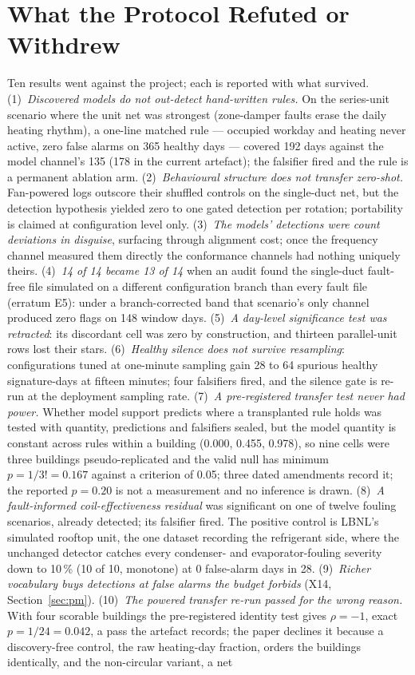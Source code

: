 \documentclass[11pt,letterpaper]{article}
\begin{document}
\section{What the Protocol Refuted or Withdrew}
\label{sec:falsified}

Ten results went against the project; each is reported with what survived. (1)~\emph{Discovered models do not out-detect hand-written rules.} On the series-unit scenario where the unit net was strongest (zone-damper faults erase the daily heating rhythm), a one-line matched rule --- occupied workday and heating never active, zero false alarms on 365 healthy days --- covered 192 days against the model channel's 135 (178 in the current artefact); the falsifier fired and the rule is a permanent ablation arm. (2)~\emph{Behavioural structure does not transfer zero-shot.} Fan-powered logs outscore their shuffled controls on the single-duct net, but the detection hypothesis yielded zero to one gated detection per rotation; portability is claimed at configuration level only. (3)~\emph{The models' detections were count deviations in disguise}, surfacing through alignment cost; once the frequency channel measured them directly the conformance channels had nothing uniquely theirs. (4)~\emph{14 of 14 became 13 of 14} when an audit found the single-duct fault-free file simulated on a different configuration branch than every fault file (erratum E5): under a branch-corrected band that scenario's only channel produced zero flags on 148 window days. (5)~\emph{A day-level significance test was retracted}: its discordant cell was zero by construction, and thirteen parallel-unit rows lost their stars. (6)~\emph{Healthy silence does not survive resampling}: configurations tuned at one-minute sampling gain 28 to 64 spurious healthy signature-days at fifteen minutes; four falsifiers fired, and the silence gate is re-run at the deployment sampling rate. (7)~\emph{A pre-registered transfer test never had power.} Whether model support predicts where a transplanted rule holds was tested with quantity, predictions and falsifiers sealed, but the model quantity is constant across rules within a building (0.000, 0.455, 0.978), so nine cells were three buildings pseudo-replicated and the valid null has minimum $p = 1/3! = 0.167$ against a criterion of 0.05; three dated amendments record it; the reported $p = 0.20$ is not a measurement and no inference is drawn. (8)~\emph{A fault-informed coil-effectiveness residual} was significant on one of twelve fouling scenarios, already detected; its falsifier fired. The positive control is LBNL's simulated rooftop unit, the one dataset recording the refrigerant side, where the unchanged detector catches every condenser- and evaporator-fouling severity down to 10\,\% (10 of 10, monotone) at 0 false-alarm days in 28. (9)~\emph{Richer vocabulary buys detections at false alarms the budget forbids} (X14, Section~\ref{sec:pm}). (10)~\emph{The powered transfer re-run passed for the wrong reason.} With four scorable buildings the pre-registered identity test gives $\rho = -1$, exact $p = 1/24 = 0.042$, a pass the artefact records; the paper declines it because a discovery-free control, the raw heating-day fraction, orders the buildings identically, and the non-circular variant, a net 
\end{document}

